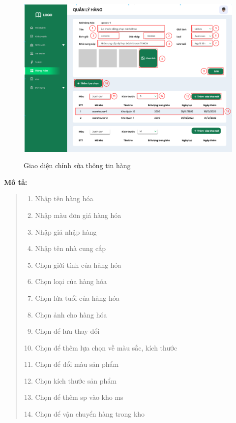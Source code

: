             \begin{figure}[!htp]
                \centering
                \includegraphics[width=12cm]{img/UI/admin/Goods_edit.png}
                \label{38}
                \newline
                \caption{Giao diện chỉnh sửa thông tin hàng}
            \end{figure}
            \textbf{Mô tả:}  
            \begin{quote}
                \begin{enumerate}
                    \item Nhập tên hàng hóa
                    \item Nhập màu đơn giá hàng hóa
                    \item Nhập giá nhập hàng
                    \item Nhập tên nhà cung cấp
                    \item Chọn giới tính của hàng hóa
                    \item Chọn loại của hàng hóa
                    \item Chọn lứa tuổi của hàng hóa
                    \item Chọn ảnh cho hàng hóa
                    \item Chọn để lưu thay đổi
                    \item Chọn để thêm lựa chọn về màu sắc, kích thước
                    \item Chọn để đổi màu sản phẩm
                    \item Chọn kích thước sản phẩm
                    \item Chọn để thêm sp vào kho ms
                    \item Chọn để vận chuyển hàng trong kho
                \end{enumerate}
            \end{quote}
        
